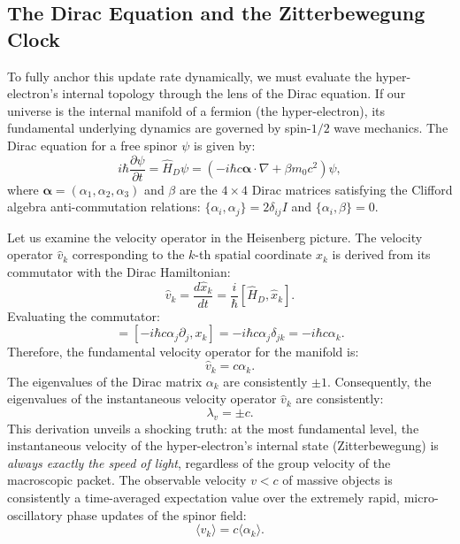 \subsection{The Dirac Equation and the Zitterbewegung Clock}
To fully anchor this update rate dynamically, we must evaluate the hyper-electron's internal topology through the lens of the Dirac equation. If our universe is the internal manifold of a fermion (the hyper-electron), its fundamental underlying dynamics are governed by spin-$1/2$ wave mechanics. The Dirac equation for a free spinor $\psi$ is given by:
\begin{equation}
    i\hbar \frac{\partial \psi}{\partial t} = \hat{H}_D \psi = \left( -i\hbar c \boldsymbol{\alpha} \cdot \nabla + \beta m_0 c^2 \right) \psi,
\end{equation}
where $\boldsymbol{\alpha} = (\alpha_1, \alpha_2, \alpha_3)$ and $\beta$ are the $4 \times 4$ Dirac matrices satisfying the Clifford algebra anti-commutation relations: $\{\alpha_i, \alpha_j\} = 2\delta_{ij}I$ and $\{\alpha_i, \beta\} = 0$.

Let us examine the velocity operator in the Heisenberg picture. The velocity operator $\hat{v}_k$ corresponding to the $k$-th spatial coordinate $x_k$ is derived from its commutator with the Dirac Hamiltonian:
\begin{equation}
    \hat{v}_k = \frac{d\hat{x}_k}{dt} = \frac{i}{\hbar} [\hat{H}_D, \hat{x}_k].
\end{equation}
Evaluating the commutator:
\begin{equation}
    [\hat{H}_D, \hat{x}_k] = [-i\hbar c \alpha_j \partial_j, x_k] = -i\hbar c \alpha_j \delta_{jk} = -i\hbar c \alpha_k.
\end{equation}
Therefore, the fundamental velocity operator for the manifold is:
\begin{equation}
    \hat{v}_k = c \alpha_k.
\end{equation}
The eigenvalues of the Dirac matrix $\alpha_k$ are consistently $\pm 1$. Consequently, the eigenvalues of the instantaneous velocity operator $\hat{v}_k$ are consistently:
\begin{equation}
    \lambda_v = \pm c.
\end{equation}
This derivation unveils a shocking truth: at the most fundamental level, the instantaneous velocity of the hyper-electron's internal state (Zitterbewegung) is \textit{always exactly the speed of light}, regardless of the group velocity of the macroscopic packet. The observable velocity $v < c$ of massive objects is consistently a time-averaged expectation value over the extremely rapid, micro-oscillatory phase updates of the spinor field:
\begin{equation}
    \langle v_k \rangle = c \langle \alpha_k \rangle.
\end{equation}

